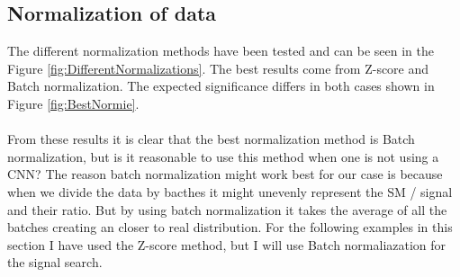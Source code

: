 \documentclass[14pt, a4paper]{book}
\begin{document}
\subsection{Normalization of data}\label{sec:normie_NN_res}
The different normalization methods have been tested and can be seen in the Figure \ref{fig:DifferentNormalizations}. The best results come from Z-score and Batch normalization. The expected significance differs in both cases shown in Figure \ref{fig:BestNormie}.\\
\\From these results it is clear that the best normalization method is Batch normalization, but is it reasonable to use this method when one is not using a CNN? The reason batch normalization might work best for our case is because when we divide the data by bacthes it might unevenly represent the SM / signal and their ratio. But by using batch normalization it takes the average of all the batches creating an closer to real distribution. 
For the following examples in this section I have used the Z-score method, but I will use Batch normaliazation for the signal search.\\ 
\graphicspath{{../../../Plots/TESTING/NeuralNetwork/NORMALIZATIONS/}}
\end{document}
